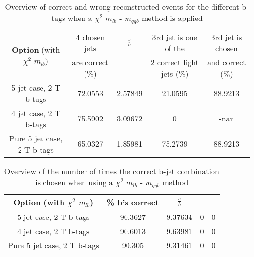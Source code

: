  \begin{table}[!h] 
 \begin{tabular}{c|c|c|c|c} 
\multirow{2}{*}{\textbf{Option} (with $\chi^{2}$ $m_{lb}$)} & 4 chosen jets & $\frac{s}{b}$ & 3rd jet is one of the & 3rd jet is chosen \\ & are correct ($\%$)    & 	             & 2 correct light jets ($\%$) &  and correct ($\%$)	  \\ \hline 
 5 jet case,      2 T b-tags              & 72.0553 & 2.57849 & 21.0595 & 88.9213 \\ 
 4 jet case,      2 T b-tags              & 75.5902 & 3.09672 & 0 & -nan \\ 
 Pure 5 jet case, 2 T b-tags              & 65.0327 & 1.85981 & 75.2739 & 88.9213 \\ 
 \end{tabular} 
 \caption{Overview of correct and wrong reconstructed events for the different b-tags when a $\chi^{2}$ $m_{lb}$ - $m_{qqb}$ method is applied} 
 \end{table} 
 
 \begin{table}[!h] 
 \begin{tabular}{c|c|c|c|c} 
 \textbf{Option} (with $\chi^{2}$ $m_{lb}$) & \% b's correct   & $\frac{s}{b}$ &  &  \\ \hline 
 5 jet case,      2 T b-tags              & 90.3627 & 9.37634 & 0 & 0 \\ 
 4 jet case,      2 T b-tags              & 90.6013 & 9.63981 & 0 & 0 \\ 
 Pure 5 jet case, 2 T b-tags              & 90.305 & 9.31461 & 0 & 0 \\ 
 \end{tabular} 
 \caption{Overview of the number of times the correct b-jet combination is chosen when using a $\chi^{2}$ $m_{lb}$ - $m_{qqb}$ method} 
 \end{table} 
 
